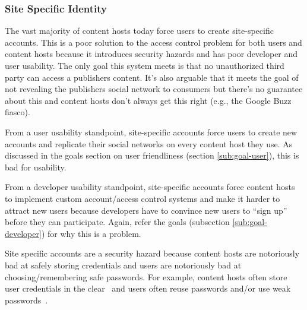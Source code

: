 \documentclass[pdftex,12pt,a4papaer]{report}
\begin{document}
\subsubsection{Site Specific Identity}

The vast majority of content hosts today force users to create site-specific
accounts. This is a poor solution to the access control problem for both users
and content hosts because it introduces security hazards and has poor developer
and user usability. The only goal this system meets is that no unauthorized
third party can access a publishers content. It's also arguable that it
meets the goal of not revealing the publishers social network to consumers
but there's no guarantee about this and content hosts don't always get this
right (e.g., the Google Buzz~\cite{google-buzz} fiasco).

From a user usability standpoint, site-specific accounts force users to create new
accounts and replicate their social networks on every content host they use. As
discussed in the goals section on user friendliness (section \ref{sub:goal-user}), this is
bad for usability.


From a developer usability standpoint, site-specific accounts force content
hosts to implement custom account/access control systems and make it harder to
attract new users because developers have to convince new users to ``sign up''
before they can participate. Again, refer the goals (subsection \ref{sub:goal-developer}) for
why this is a problem.


Site specific accounts are a security hazard because content hosts are
notoriously bad at safely storing credentials and users are notoriously bad at
choosing/remembering safe passwords. For example, content hosts often store user
credentials in the clear~\cite{plaintext} and users often reuse passwords and/or
use weak passwords~\cite{ms-passwords}.

\end{document}
